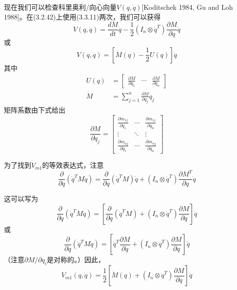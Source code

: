 \documentclass[12pt,a4paper]{ctexart}
\begin{document}
现在我们可以检查科里奥利/向心向量$V(q,\dot{q})$[Koditschek 1984, Gu and Loh 1988]。在(3.2.42)上使用(3.3.11)两次，我们可以获得
\begin{equation}
V(q,\dot{q}) = \frac{dM}{dt}\dot{q} - \frac{1}{2}(I_n \otimes \dot{q}^T)\frac{\partial M}{\partial q}\dot{q}
\end{equation}
或
\begin{equation}
V(q,\dot{q}) = [\dot{M}(q) - \frac{1}{2}U(q)]\dot{q}
\end{equation}
其中
\begin{align}
U(q) &= \begin{bmatrix} \frac{\partial M}{\partial q_1} & \cdots & \frac{\partial M}{\partial q_n} \end{bmatrix} \\
\dot{M} &= \sum_{j=1}^{n}\frac{\partial M}{\partial q_j}\dot{q}_j
\end{align}
矩阵系数由下式给出
\begin{equation}
\frac{\partial M}{\partial q_j} = \begin{bmatrix} \frac{\partial m_{1j}}{\partial q_1} & \cdots & \frac{\partial m_{1j}}{\partial q_n} \\ \vdots & \ddots & \vdots \\ \frac{\partial m_{nj}}{\partial q_1} & \cdots & \frac{\partial m_{nj}}{\partial q_n} \end{bmatrix}
\end{equation}

为了找到$V_{m1}$的等效表达式，注意
\begin{equation}
\frac{\partial}{\partial q}(\dot{q}^T M \dot{q}) = \frac{\partial}{\partial q}(\dot{q}^T M) \dot{q} + (I_n \otimes \dot{q}^T)\frac{\partial M^T}{\partial q}\dot{q}
\end{equation}

这可以写为
\begin{equation}
\frac{\partial}{\partial q}(\dot{q}^T M \dot{q}) = \left[\frac{\partial}{\partial q}(\dot{q}^T M) + (I_n \otimes \dot{q}^T)\frac{\partial M}{\partial q}\right]\dot{q}
\end{equation}
或
\begin{equation}
\frac{\partial}{\partial q}(\dot{q}^T M \dot{q}) = \left[\dot{q}^T\frac{\partial M}{\partial q} + (I_n \otimes \dot{q}^T)\frac{\partial M}{\partial q}\right]\dot{q}
\end{equation}
（注意$\partial M/\partial q_i$是对称的。）因此，
\begin{equation}
V_{m1}(q,\dot{q}) = \frac{1}{2}\left[\dot{M}(q) + (I_n \otimes \dot{q}^T)\frac{\partial M}{\partial q}\right]\dot{q}
\end{equation}
\end{document}
